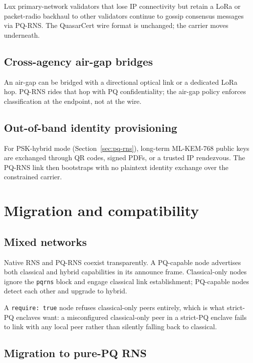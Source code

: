 \documentclass[11pt,a4paper]{article}
\begin{document}
Lux primary-network validators that lose IP connectivity but retain a
LoRa or packet-radio backhaul to other validators continue to gossip
consensus messages via PQ-RNS. The QuasarCert wire format is
unchanged; the carrier moves underneath.

\subsection{Cross-agency air-gap bridges}

An air-gap can be bridged with a directional optical link or a
dedicated LoRa hop. PQ-RNS rides that hop with PQ confidentiality;
the air-gap policy enforces classification at the endpoint, not at
the wire.

\subsection{Out-of-band identity provisioning}

For PSK-hybrid mode (Section~\ref{sec:pq-rns}), long-term ML-KEM-768
public keys are exchanged through QR codes, signed PDFs, or a
trusted IP rendezvous. The PQ-RNS link then bootstraps with no
plaintext identity exchange over the constrained carrier.

\section{Migration and compatibility}
\label{sec:migration}

\subsection{Mixed networks}

Native RNS and PQ-RNS coexist transparently. A PQ-capable node
advertises both classical and hybrid capabilities in its announce
frame. Classical-only nodes ignore the \texttt{pqrns} block and engage
classical link establishment; PQ-capable nodes detect each other and
upgrade to hybrid.

A \texttt{require: true} node refuses classical-only peers entirely,
which is what strict-PQ enclaves want: a misconfigured classical-only
peer in a strict-PQ enclave fails to link with any local peer rather
than silently falling back to classical.

\subsection{Migration to pure-PQ RNS}
\end{document}
